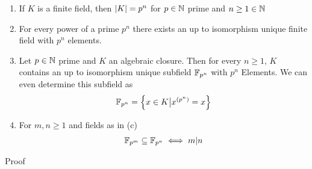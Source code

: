 \begin{theorem}
	\begin{enumerate}
		\item If $K$ is a finite field, then $\vert K\vert = p^{n}$ for $p \in \mathbb{N}$ prime and $n \geq 1 \in \mathbb{N}$
		\item For every power of a prime $p^{n}$ there exists an up to isomorphism unique finite field with $p^{n}$ elements.
		\item Let $p \in \mathbb{N}$ prime and $K$ an algebraic closure. Then for every $n \geq 1$, $K$ contains an up to isomorphism unique subfield $\mathbb{F}_{p^{n}}$ with $p^{n}$ Elements. We can even determine this subfield as
			\begin{align*}
				\mathbb{F}_{p^{n}} = \left\{x \in K \big\vert x^{(p^{n})} = x\right\}
			\end{align*}
		\item For $m,n \geq 1$ and fields as in (c)
			\begin{align*}
				\mathbb{F}_{p^{m}} \subseteq \mathbb{F}_{p^{n}} \iff m|n
			\end{align*}
	\end{enumerate}
\end{theorem}
Proof
